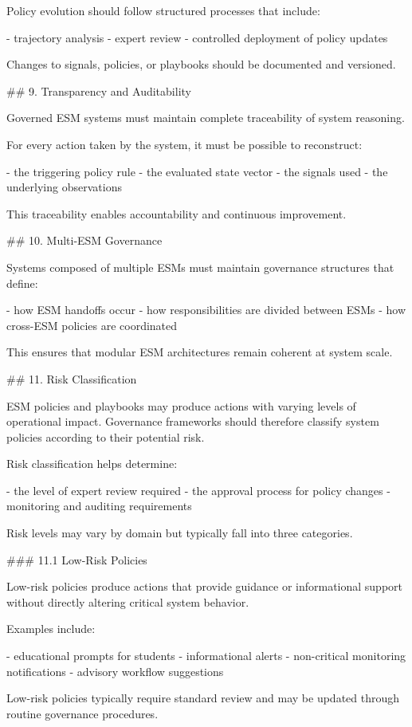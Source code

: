 Policy evolution should follow structured processes that include:

- trajectory analysis
- expert review
- controlled deployment of policy updates

Changes to signals, policies, or playbooks should be documented and versioned.

## 9. Transparency and Auditability

Governed ESM systems must maintain complete traceability of system reasoning.

For every action taken by the system, it must be possible to reconstruct:

- the triggering policy rule
- the evaluated state vector
- the signals used
- the underlying observations

This traceability enables accountability and continuous improvement.

## 10. Multi-ESM Governance

Systems composed of multiple ESMs must maintain governance structures that define:

- how ESM handoffs occur
- how responsibilities are divided between ESMs
- how cross-ESM policies are coordinated

This ensures that modular ESM architectures remain coherent at system scale.

## 11. Risk Classification

ESM policies and playbooks may produce actions with varying levels of operational impact. Governance frameworks should therefore classify system policies according to their potential risk.

Risk classification helps determine:

- the level of expert review required
- the approval process for policy changes
- monitoring and auditing requirements

Risk levels may vary by domain but typically fall into three categories.

### 11.1 Low-Risk Policies

Low-risk policies produce actions that provide guidance or informational support without directly altering critical system behavior.

Examples include:

- educational prompts for students
- informational alerts
- non-critical monitoring notifications
- advisory workflow suggestions

Low-risk policies typically require standard review and may be updated through routine governance procedures.

